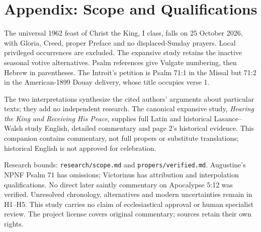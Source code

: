 \section{Appendix: Scope and Qualifications}
The universal 1962 feast of Christ the King, I class, falls on 25 October 2026, with Gloria, Creed, proper Preface and no displaced-Sunday prayers. Local privileged occurrences are excluded. The expansive study retains the inactive seasonal votive alternatives. Psalm references give Vulgate numbering, then Hebrew in parentheses. The Introit's petition is Psalm 71:1 in the Missal but 71:2 in the American-1899 Douay delivery, whose title occupies verse 1.

The two interpretations synthesize the cited authors' arguments about particular texts; they add no independent research. The canonical expansive study, \emph{Hearing the King and Receiving His Peace}, supplies full Latin and historical Lasance--Walsh study English, detailed commentary and page 2's historical evidence. This companion contains commentary, not full propers or substitute translations; historical English is not approved for celebration.

Research bounds: \texttt{research/scope.md} and \texttt{propers/verified.md}. Augustine's NPNF Psalm 71 has omissions; Victorinus has attribution and interpolation qualifications. No direct later saintly commentary on Apocalypse 5:12 was verified. Unresolved chronology, alternatives and modern uncertainties remain in H1--H5. This study carries no claim of ecclesiastical approval or human specialist review. The project license covers original commentary; sources retain their own rights.

